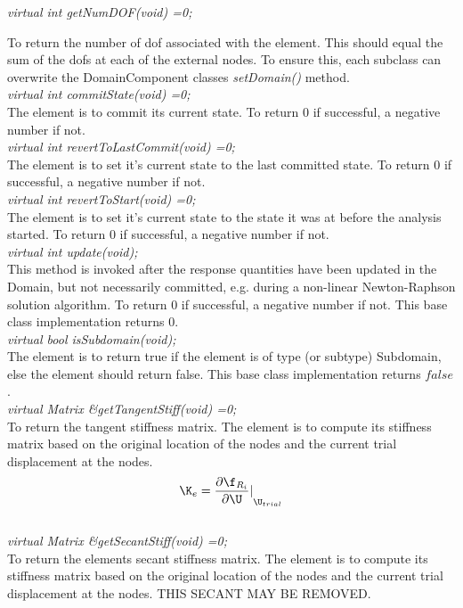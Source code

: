 {\em virtual int getNumDOF(void) =0;}

To return the number of dof associated with the element. This should
equal the sum of the dofs at each of the external nodes. To ensure
this, each subclass can overwrite the DomainComponent classes {\em
setDomain()} method.\\ 

{\em virtual int commitState(void) =0;} \\
The element is to commit its current state. To return $0$ if
successful, a negative number if not. \\

{\em virtual int revertToLastCommit(void) =0;} \\
The element is to set it's current state to the last committed
state. To return $0$ if successful, a negative number if not. \\

{\em virtual int revertToStart(void) =0;} \\
The element is to set it's current state to the state it was at before
the analysis started. To return $0$ if successful, a negative number
if not. \\ 

{\em virtual int update(void);} \\
This method is invoked after the response quantities have been updated
in the Domain, but not necessarily committed, e.g. during a
non-linear Newton-Raphson solution algorithm. To return $0$ if
successful, a negative number if not. This base class implementation returns
$0$. \\

{\em virtual bool isSubdomain(void);} \\
The element is to return true if the element is of type (or subtype)
Subdomain, else the element should return false. This base class
implementation returns $false$. \\


{\em virtual Matrix \&getTangentStiff(void) =0;} \\
To return the tangent stiffness matrix. The element is to compute its
stiffness matrix based on the original location of the nodes and the
current trial displacement at the nodes. \\ 

$$ 
\K_e = {\frac{\partial \f_{R_i}}{\partial \U}
\vert}_{\U_{trial}}

$$

$$


{\em virtual Matrix \&getSecantStiff(void) =0;} \\
To return the elements secant stiffness matrix. The element is to
compute its stiffness matrix based on the original location of the
nodes and the current trial displacement at the nodes. THIS SECANT MAY
BE REMOVED. \\

